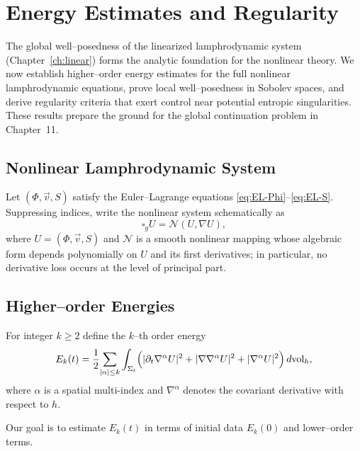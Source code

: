 \chapter{Energy Estimates and Regularity}
\label{ch:energy-regularity}

The global well--posedness of the linearized lamphrodynamic system
(Chapter~\ref{ch:linear}) forms the analytic foundation for the
nonlinear theory.  We now establish higher--order energy estimates for
the full nonlinear lamphrodynamic equations, prove local well--posedness
in Sobolev spaces, and derive regularity criteria that exert control
near potential entropic singularities.  These results prepare the ground
for the global continuation problem in Chapter~11.



\section{Nonlinear Lamphrodynamic System}
\label{sec:nonlinear-system}

Let $(\Phi,\vec v,S)$ satisfy the Euler--Lagrange equations
\eqref{eq:EL-Phi}--\eqref{eq:EL-S}.
Suppressing indices, write the nonlinear system schematically as
\begin{equation}
\label{eq:nonlinear-system}
\square_{g}U
=
\mathcal{N}(U,\nabla U),
\end{equation}
where $U=(\Phi,\vec v,S)$ and $\mathcal{N}$ is a smooth nonlinear
mapping whose algebraic form depends polynomially on $U$ and its first
derivatives; in particular, no derivative loss occurs at the level of
principal part.



\section{Higher--order Energies}
\label{sec:higher-order-energies}

For integer $k\ge2$ define the $k$--th order energy
\begin{equation}
\label{eq:Ek}
E_{k}(t)
=
\frac{1}{2}\!
\sum_{|\alpha|\le k}
\int_{\Sigma_{t}}
\Bigl(
|\partial_{t}\nabla^{\alpha}U|^{2}
 + |\nabla\nabla^{\alpha}U|^{2}
 + |\nabla^{\alpha}U|^{2}
\Bigr)\, d\mathrm{vol}_{h},
\end{equation}
where $\alpha$ is a spatial multi-index and $\nabla^{\alpha}$ denotes
the covariant derivative with respect to $h$.

Our goal is to estimate $E_{k}(t)$ in terms of initial data
$E_{k}(0)$ and lower--order terms.



